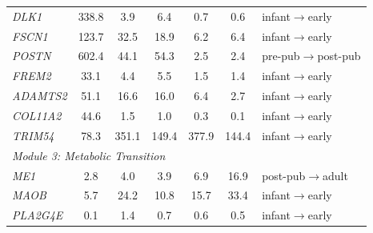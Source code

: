 \documentclass[10pt,a4paper]{article}
\begin{document}
\begin{table}[H]
\begin{tabular}{lcccccl}
    \textit{DLK1} & 338.8 & 3.9 & 6.4 & 0.7 & 0.6 & infant$\to$early \\
    \textit{FSCN1} & 123.7 & 32.5 & 18.9 & 6.2 & 6.4 & infant$\to$early \\
    \textit{POSTN} & 602.4 & 44.1 & 54.3 & 2.5 & 2.4 & pre-pub$\to$post-pub \\
    \textit{FREM2} & 33.1 & 4.4 & 5.5 & 1.5 & 1.4 & infant$\to$early \\
    \textit{ADAMTS2} & 51.1 & 16.6 & 16.0 & 6.4 & 2.7 & infant$\to$early \\
    \textit{COL11A2} & 44.6 & 1.5 & 1.0 & 0.3 & 0.1 & infant$\to$early \\
    \textit{TRIM54} & 78.3 & 351.1 & 149.4 & 377.9 & 144.4 & infant$\to$early \\
    \midrule
    \multicolumn{7}{l}{\textit{Module 3: Metabolic Transition}} \\
    \textit{ME1} & 2.8 & 4.0 & 3.9 & 6.9 & 16.9 & post-pub$\to$adult \\
    \textit{MAOB} & 5.7 & 24.2 & 10.8 & 15.7 & 33.4 & infant$\to$early \\
    \textit{PLA2G4E} & 0.1 & 1.4 & 0.7 & 0.6 & 0.5 & infant$\to$early \\
    \bottomrule
  \end{tabular}
\end{table}
\restoregeometry

\clearpage
\end{document}
